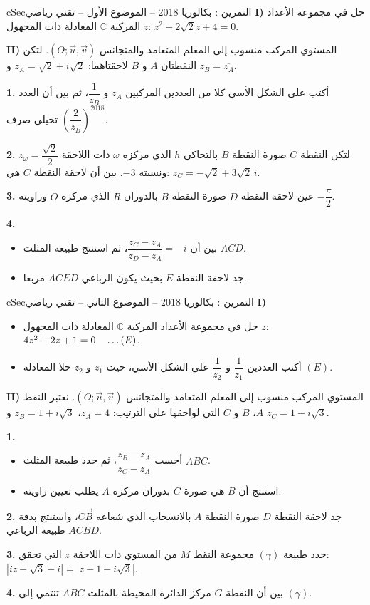\documentclass[12pt,a4paper]{article}
\newenvironment{BOX}[2]{\begin{otherlanguage}{english}\begin{arbox}{#1}{#2}}{\end{arbox}\end{otherlanguage}}
\newcounter{exo}
\newenvironment{tamrin}[1]{\stepcounter{exo}\begin{BOX}{cSec}{التمرين \theexo: #1}}{\end{BOX}}
\renewcommand{\dots}{\mathinner{\ldotp\ldotp\ldotp}}
\newenvironment{sq}{\begin{itemize}[leftmargin=2.4em,itemsep=3pt]}{\end{itemize}}
\newcommand{\qa}{\item[(أ)]}\newcommand{\qb}{\item[(ب)]}\newcommand{\qc}{\item[(جـ)]}\newcommand{\qd}{\item[(د)]}\newcommand{\qe}{\item[(هـ)]}
\newcommand{\QQ}[1]{\par\smallskip\textbf{#1.} }
\begin{document}
\begin{tamrin}{بكالوريا 2018 -- الموضوع الأول -- تقني رياضي}
\textbf{I)} حل في مجموعة الأعداد المركبة $\mathbb{C}$ المعادلة ذات المجهول $z$: $z^2-2\sqrt2z+4=0$.

\textbf{II)} المستوي المركب منسوب إلى المعلم المتعامد والمتجانس $(O;\vec u,\vec v)$. لتكن النقطتان $A$ و $B$ لاحقتاهما: $z_A=\sqrt2+i\sqrt2$ و $z_B=\overline{z_A}$.

\QQ{1} أكتب على الشكل الأسي كلا من العددين المركبين $z_A$ و $\dfrac{1}{z_B}$، ثم بين أن العدد $\left(\dfrac{2}{z_B}\right)^{2018}$ تخيلي صرف.

\QQ{2} لتكن النقطة $C$ صورة النقطة $B$ بالتحاكي $h$ الذي مركزه $\omega$ ذات اللاحقة $z_\omega=\dfrac{\sqrt2}{2}$ ونسبته $-3$.
بين أن لاحقة النقطة $C$ هي: $z_C=-\sqrt2+3\sqrt2\,i$.

\QQ{3} عين لاحقة النقطة $D$ صورة النقطة $B$ بالدوران $R$ الذي مركزه $O$ وزاويته $-\dfrac{\pi}{2}$.

\QQ{4}
\begin{sq}
\qa بين أن $\dfrac{z_C-z_A}{z_D-z_A}=-i$، ثم استنتج طبيعة المثلث $ACD$.
\qb جد لاحقة النقطة $E$ بحيث يكون الرباعي $ACED$ مربعا.
\end{sq}
\end{tamrin}

\begin{tamrin}{بكالوريا 2018 -- الموضوع الثاني -- تقني رياضي}
\textbf{I)}
\begin{sq}
\qa حل في مجموعة الأعداد المركبة $\mathbb{C}$ المعادلة ذات المجهول $z$: $4z^2-2z+1=0\quad\dots(E)$.
\qb أكتب العددين $\dfrac{1}{z_1}$ و $\dfrac{1}{z_2}$ على الشكل الأسي، حيث $z_1$ و $z_2$ حلا المعادلة $(E)$.
\end{sq}
\textbf{II)} المستوي المركب منسوب إلى المعلم المتعامد والمتجانس $(O;\vec u,\vec v)$. نعتبر النقط $A$، $B$ و $C$ التي لواحقها على الترتيب: $z_A=4$، $z_B=1+i\sqrt3$ و $z_C=1-i\sqrt3$.

\QQ{1}
\begin{sq}
\qa أحسب $\dfrac{z_B-z_A}{z_C-z_A}$، ثم حدد طبيعة المثلث $ABC$.
\qb استنتج أن $B$ هي صورة $C$ بدوران مركزه $A$ يطلب تعيين زاويته.
\end{sq}
\QQ{2} جد لاحقة النقطة $D$ صورة النقطة $A$ بالانسحاب الذي شعاعه $\overrightarrow{CB}$، واستنتج بدقة طبيعة الرباعي $ACBD$.

\QQ{3} حدد طبيعة $(\gamma)$ مجموعة النقط $M$ من المستوي ذات اللاحقة $z$ التي تحقق: $\left|iz+\sqrt3-i\right|=\left|z-1+i\sqrt3\right|$.

\QQ{4} بين أن النقطة $G$ مركز الدائرة المحيطة بالمثلث $ABC$ تنتمي إلى $(\gamma)$.
\end{tamrin}
\end{document}
